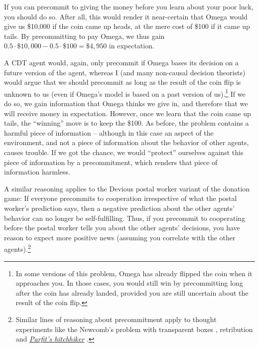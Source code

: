 If you can precommit to giving the money before you learn about your
poor luck, you should do so. After all, this would render it
near-certain that Omega would give us \$10,000 if the coin came up
heads, at the mere cost of \$100 if it came up tails. By precommitting to
pay Omega, we thus gain
$0.5 \cdot \$ 10,000  - 0.5 \cdot \$ 100 = \$ 4,950$ in
expectation.

A CDT agent would, again, only precommit if Omega bases its decision on
a future version of the agent, whereas I (and many non-causal decision
theorists) would argue that we should precommit as long as the result of
the coin flip is unknown to us (even if Omega's model is based on a past
version of us).\footnote{In some versions of this problem, Omega has
  already flipped the coin when it approaches you. In those cases, you
  would still win by precommitting long after the coin has already
  landed, provided you are still uncertain about the result of the coin
  flip.} If we do so, we gain information that Omega thinks we give in,
and therefore that we will receive money in expectation. However, once
we learn that the coin came up tails, the ``winning'' move is to keep
the \$100. As before, the problem contains a harmful piece of
information -- although in this case an aspect of the environment, and
not a piece of information about the behavior of other agents, causes
trouble. If we got the chance, we would ``protect'' ourselves against
this piece of information by a precommitment, which renders that piece
of information harmless.

A similar reasoning applies to the Devious postal worker variant of the
donation game: If everyone precommits to cooperation irrespective of
what the postal worker's prediction says, then a negative prediction
about the other agents' behavior can no longer be self-fulfilling. Thus,
if you precommit to cooperating before the postal worker tells you about
the other agents' decisions, you have reason to expect more positive
news (assuming you correlate with the other agents).\footnote{Similar
  lines of reasoning about precommitment apply to thought experiments
  like the Newcomb's problem with transparent boxes
  \parencite{Drescher2006-ky}, retribution
  \parencite{Drescher2006-ky} and
  \href{https://wiki.lesswrong.com/wiki/Parfit\%27s_hitchhiker}{\emph{Parfit's
  hitchhiker}} \parencite{Parfit1984-ne}.}

